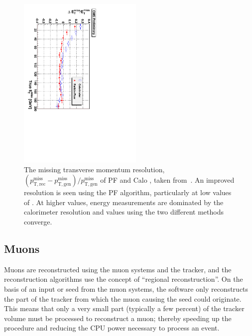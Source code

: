 \begin{figure}[htbp]
  \begin{center}
  \includegraphics[width=0.53\textwidth, angle =90]{Figures/detector/METresPF.pdf}
  \caption{The missing transverse momentum resolution, 
  $(p^{\mathrm{miss}}_{\mathrm{T,rec}} - p^{\mathrm{miss}}_{\mathrm{T,gen}})/p^{\mathrm{miss}}_{\mathrm{T,gen}}$ of \ac{PF} and Calo \MET, taken from~\cite{PFT-09-001}. An improved resolution is seen using the \ac{PF} algorithm, particularly at low values of \MET. At higher \MET values, energy measurements are dominated by the calorimeter resolution and values using the two different methods converge.}
  \label{fig:PFMET}
  \end{center}
\end{figure}

\subsection{Muons}

Muons are reconstructed using the muon systems and the tracker, and the reconstruction algorithms use the concept of ``regional reconstruction''. 
On the basis of an input or seed from the muon systems, the software only reconstructs the part of the tracker from which the muon causing the seed could originate.
This means that only a very small part (typically a few percent) of the tracker volume must be processed to reconstruct a muon; thereby speeding up the procedure and reducing the CPU power necessary to process an event.

